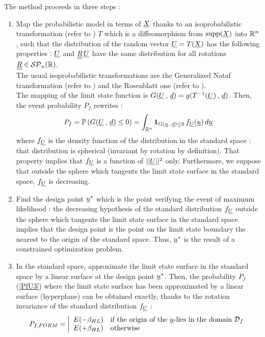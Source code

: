 {  The method proceeds in three steps :

  \begin{enumerate}
  \item Map the probabilistic model in terms of ${\underline{X}}$ thanks to an isoprobabilistic transformation (refer to ) $T$ which is a diffeomorphism from $\operatorname*{supp}({\underline{X}})$ into ${\mathbb R}^n$, such that the distribution of the random vector ${\underline{U}}=T({\underline{X}})$ has the following properties : ${\underline{U}}$ and ${\underline{\underline{R}}}\,{\underline{U}}$ have the same distribution for all rotations ${\underline{\underline{R}}}\in{{\mathcal S}{\mathcal P}}_n({\mathbb R})$.\\
    The usual isoprobabilistic transformations are the Generalized Nataf transformation (refer to ) and the Rosenblatt one (refer to ).\\
    The mapping of the limit state function is $G({\underline{U}}\,,\,{\underline{d}}) =  g(T^{-1}({\underline{U}})\,,\,{\underline{d}})$. Then, the event probability $P_f$ rewrites :
    \begin{equation}\label{PfU3}
      P_f = {\mathbb P}\left( G({\underline{U}}\,,\,{\underline{d}})\leq 0 \right) = \int_{{\mathbb R}^n} \boldsymbol{1}_{G({\underline{u}}\,,\,{\underline{d}}) \leq 0}\,f_{{\underline{U}}}({\underline{u}})\,d{\underline{u}}
    \end{equation}
    where $f_{{\underline{U}}}$ is the density function of the distribution in the standard space : that distribution is spherical (invariant by rotation by definition). That property implies that $f_{{\underline{U}}}$ is a function of $||{\underline{U}}||^2$ only. Furthermore, we suppose that outside the sphere which tangents the limit state surface in the standard space, $f_{{\underline{U}}}$ is decreasing.

  \item Find the design point ${\underline{u}}^*$ which is the point verifying the event of maximum likelihood : the decreasing hypothesis of the standard distribution $f_{{\underline{U}}}$ outside the sphere which tangents the limit state surface in the standard space implies that the design point is the point on the limit state boundary the nearest to the origin of the standard space. Thus, ${\underline{u}}^*$ is the result of a constrained optimization problem.

  \item In the standard space, approximate the limit state surface in the standard space by a linear surface at the design point $ {\underline{u}}^*$. Then, the probability $P_f$ (\ref{PfU3}) where the limit state surface has been approximated by a linear surface (hyperplane) can be obtained exactly, thanks to the rotation invariance of the standard distribution $f_{{\underline{U}}}$ :
    \begin{equation}\label{PfFORM}
      P_{f,FORM}        =
      \left|
      \begin{array}{ll}
        E(-\beta_{HL}) & \mbox{if the origin of the ${\underline{u}}$-lies in the domain ${\mathcal D}_f$} \\
        E(+\beta_{HL}) & \mbox{otherwise}
      \end{array}
      \right.
    \end{equation}


\end{enumerate}}
